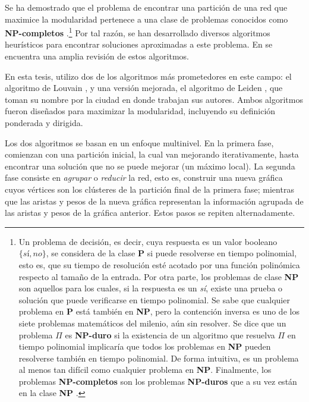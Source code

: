 Se ha demostrado que el problema de encontrar una partición de una red que maximice la modularidad pertenece a una clase de problemas conocidos como \textbf{NP-completos} \parencite{Brandes2006}.\footnote{Un problema de decisión, es decir, cuya respuesta es un valor booleano $\{sí, no\}$, se considera de la clase \textbf{P} si puede resolverse en tiempo polinomial, esto es, que su tiempo de resolución esté acotado por una función polinómica respecto al tamaño de la entrada. Por otra parte, los problemas de clase \textbf{NP} son aquellos para los cuales, si la respuesta es un \textit{sí}, existe una prueba o solución que puede verificarse en tiempo polinomial. Se sabe que cualquier problema en \textbf{P} está también en \textbf{NP}, pero la contención inversa es uno de los siete problemas matemáticos del milenio, aún sin resolver. Se dice que un problema $\Pi$ es \textbf{NP-duro}  si la existencia de un algoritmo que resuelva $\Pi$ en tiempo polinomial implicaría que todos los problemas en \textbf{NP} pueden resolverse también en tiempo polinomial. De forma intuitiva, es un problema al menos tan difícil como cualquier problema en \textbf{NP}. Finalmente, los problemas \textbf{NP-completos} son los problemas \textbf{NP-duros} que a su vez están en la clase \textbf{NP} \parencite[pp.~381--383]{Erickson2019}. 
} Por tal razón, se han desarrollado diversos algoritmos heurísticos para encontrar soluciones aproximadas a este problema. En \textcite{Fortunato2010} se encuentra una amplia revisión de estos algoritmos.

En esta tesis, utilizo dos de los algoritmos más prometedores en este campo: el algoritmo de Louvain \parencite{Blondel2008}, y una versión mejorada, el algoritmo de Leiden \parencite{Traag2019}, que toman su nombre por la ciudad en donde trabajan sus autores. Ambos algoritmos fueron diseñados para maximizar la modularidad, incluyendo su definición ponderada y dirigida.

Los dos algoritmos se basan en un enfoque multinivel. En la primera fase, comienzan con una partición inicial, la cual van mejorando iterativamente, hasta encontrar una solución que no se puede mejorar (un máximo local). La segunda fase consiste en \textit{agrupar} o \textit{reducir} la red, esto es, construir una nueva gráfica cuyos vértices son los clústeres de la partición final de la primera fase; mientras que las aristas y pesos de la nueva gráfica representan la información agrupada de las aristas y pesos de la gráfica anterior. Estos pasos se repiten alternadamente.

